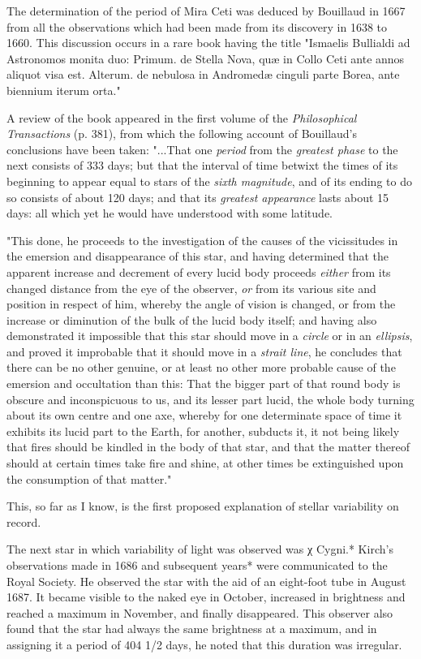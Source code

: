 \documentclass[a4paper, 12pt, oneside, polutonikogreek, english]{article}
\begin{document}
The determination of the period of Mira Ceti was deduced by Bouillaud in 1667 from all the observations which had been made from its discovery in 1638 to 1660. This discussion occurs in a rare book having the title "Ismaelis Bullialdi ad Astronomos monita duo: Primum. de Stella Nova, quæ in Collo Ceti ante annos aliquot visa est. Alterum. de nebulosa in Andromedæ cinguli parte Borea, ante biennium iterum orta."

A review of the book appeared in the first volume of the \emph{Philosophical Transactions} (p. 381), from which the following account of Bouillaud's conclusions have been taken: "...That one \emph{period} from the \emph{greatest phase} to the next consists of 333 days; but that the interval of time betwixt the times of its beginning to appear equal to stars of the \emph{sixth magnitude}, and of its ending to do so consists of about 120 days; and that its \emph{greatest appearance} lasts about 15 days: all which yet he would have understood with some latitude.

"This done, he proceeds to the investigation of the causes of the vicissitudes in the emersion and disappearance of this star, and having determined that the apparent increase and decrement of every lucid body proceeds \emph{either} from its changed distance from the eye of the observer, \emph{or} from its various site and position in respect of him, whereby the angle of vision is changed, or from the increase or diminution of the bulk of the lucid body itself; and having also demonstrated it impossible that this star should move in a \emph{circle} or in an \emph{ellipsis}, and proved it improbable that it should move in a \emph{strait line}, he concludes that there can be no other genuine, or at least no other more probable cause of the emersion and occultation than this: That the bigger part of that round body is obscure and inconspicuous to us, and its lesser part lucid, the whole body turning about its own centre and one axe, whereby for one determinate space of time it exhibits its lucid part to the Earth, for another, subducts it, it not being likely that fires should be kindled in the body of that star, and that the matter thereof should at certain times take fire and shine, at other times be extinguished upon the consumption of that matter."

This, so far as I know, is the first proposed explanation of stellar variability on record.

The next star in which variability of light was observed was χ Cygni.* Kirch's observations made in 1686 and subsequent years* were communicated to the Royal Society. He observed the star with the aid of an eight-foot tube in August 1687. It became visible to the naked eye in October, increased in brightness and reached a maximum in November, and finally disappeared. This observer also found that the star had always the same brightness at a maximum, and in assigning it a period of 404 1/2 days, he noted that this duration was irregular.
\end{document}
